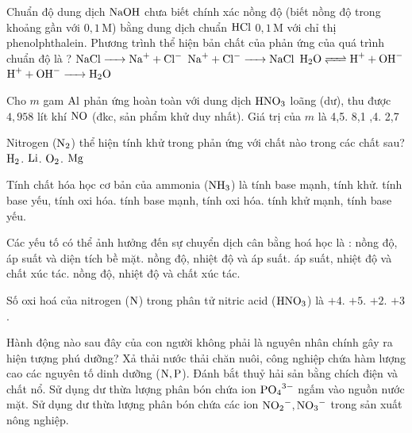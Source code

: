 \documentclass[11pt,a4paper]{article}
\begin{document}
\begin{ex}%
Chuẩn độ dung dịch $\ce{NaOH}$ chưa biết chính xác nồng độ (biết nồng độ trong khoảng gần với $0{,}1\,\text{M}$) bằng dung dịch chuẩn $\ce{HCl}$ $0{,}1\,\text{M}$ với chỉ thị phenolphthalein. Phương trình thể hiện bản chất của phản ứng của quá trình chuẩn độ là ?
\choice
{$\ce{NaCl -> Na+ + Cl-}$}
{$\ce{Na+ + Cl- -> NaCl}$}
{$\ce{H2O <=> H+ + OH-}$}
{\True $\ce{H+ + OH- -> H2O}$}

\end{ex}

\begin{ex}%
Cho $m$ gam $\ce{Al}$ phản ứng hoàn toàn với dung dịch $\ce{HNO3}$ loãng (dư), thu được $4{,}958$ lít khí $\ce{NO}$ (đkc, sản phẩm khử duy nhất). Giá trị của $m$ là
\choice
{4,5.}
{8,1}
{,4.}
{2,7}

\end{ex}

\begin{ex}%
Nitrogen ($\ce{N2}$) thể hiện tính khử trong phản ứng với chất nào trong các chất sau?
\choice
{$\ce{H2}$.}
{$\ce{Li}$.}
{\True $\ce{O2}$.}
{$\ce{Mg}$}

\end{ex}

\begin{ex}%
Tính chất hóa học cơ bản của ammonia ($\ce{NH3}$) là
\choice
{tính base mạnh, tính khử.}
{tính base yếu, tính oxi hóa.}
{tính base mạnh, tính oxi hóa.}
{\True tính khử mạnh, tính base yếu.}

\end{ex}

\begin{ex}%
Các yếu tố có thể ảnh hưởng đến sự chuyển dịch cân bằng hoá học là :
\choice
{nồng độ, áp suất và diện tích bề mặt.}
{\True nồng độ, nhiệt độ và áp suất.}
{áp suất, nhiệt độ và chất xúc tác.}
{nồng độ, nhiệt độ và chất xúc tác.}

\end{ex}

\begin{ex}%
Số oxi hoá của nitrogen ($\ce{N}$) trong phân tử nitric acid ($\ce{HNO3}$) là
\choice
{$+4$.}
{\True $+5$.}
{$+2$.}
{$+3$.}

\end{ex}

\begin{ex}%
Hành động nào sau đây của con người không phải là nguyên nhân chính gây ra hiện tượng phú dưỡng?
\choice
{Xả thải nước thải chăn nuôi, công nghiệp chứa hàm lượng cao các nguyên tố dinh dưỡng ($\ce{N, P}$).}
{\True Đánh bắt thuỷ hải sản bằng chích điện và chất nổ.}
{Sử dụng dư thừa lượng phân bón chứa ion $\ce{PO4^{3-}}$ ngấm vào nguồn nước mặt.}
{Sử dụng dư thừa lượng phân bón chứa các ion $\ce{NO2^-}, \ce{NO3^-}$ trong sản xuất nông nghiệp.}

\end{ex}
\end{document}
